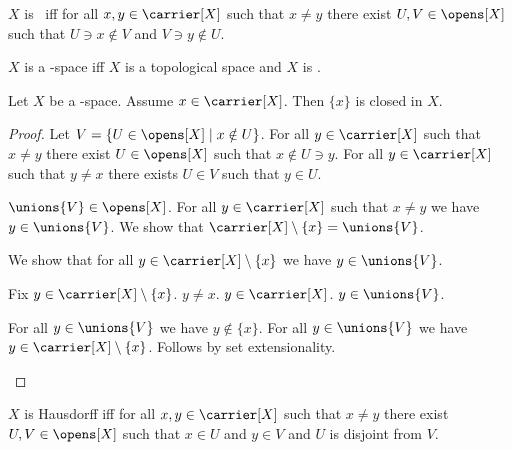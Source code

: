\begin{definition}\label{teeone}
    $X$ is \teeone\ iff
    for all $x,y\in\carrier[X]$ such that $x\neq y$
    there exist $U, V\in\opens[X]$ such that
    $U\ni x\notin V$ and $V\ni y\notin U$.
\end{definition}

\begin{abbreviation}\label{teeone_space}
    $X$ is a \teeone-space iff $X$ is a topological space and
    $X$ is \teeone.
\end{abbreviation}

\begin{proposition}\label{teeone_implies_singletons_closed}
    Let $X$ be a \teeone-space.
    Assume $x \in \carrier[X]$.
    Then $\{x\}$ is closed in $X$.
\end{proposition}
\begin{proof}
    Let $V = \{ U \in \opens[X] \mid x \notin U\}$.
    For all $y \in \carrier[X]$ such that $x \neq y$ there exist $U \in \opens[X]$ such that $x \notin U \ni y$.
    For all $y \in \carrier[X]$ such that $y \neq x$ there exists $U \in V$ such that $y \in U$.

    $\unions{V} \in \opens[X]$.
    For all $y \in \carrier[X]$ such that $x \neq y$ we have $y \in \unions{V}$.
    We show that $\carrier[X] \setminus \{x\} = \unions{V}$.
    \begin{subproof}
        We show that for all $y \in \carrier[X] \setminus \{x\}$ we have $y \in \unions{V}$.
        \begin{subproof}
            Fix $y \in \carrier[X] \setminus \{x\}$.
            $y \neq x$.
            $y \in \carrier[X]$.
            $y \in \unions{V}$.
        \end{subproof}
        For all $y \in \unions{V}$ we have $y \notin \{x\}$.
        For all $y \in \unions{V}$ we have $y \in \carrier[X] \setminus \{x\}$.
        Follows by set extensionality.
    \end{subproof}
\end{proof}
%

\begin{definition}\label{is_hausdorff}
    $X$ is Hausdorff iff
    for all $x,y\in\carrier[X]$ such that $x\neq y$
    there exist $U, V\in\opens[X]$ such that
    $x\in U$ and $y\in V$ and $U$ is disjoint from $V$.
\end{definition}


